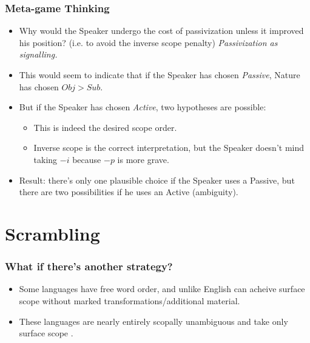 \documentclass[aspectratio=169]{beamer}
\begin{document}
\begin{frame}
	\frametitle{Meta-game Thinking}\pause

	\begin{itemize}
		\item Why would the Speaker undergo the cost of passivization unless it improved his position? (i.e. to avoid the inverse scope penalty) \textit{Passivization as signalling.}\pause
		\item This would seem to indicate that if the Speaker has chosen \textit{Passive}, Nature has chosen $Obj > Sub$.\pause
		\item But if the Speaker has chosen \textit{Active}, two hypotheses are possible:\pause
			\begin{itemize}
				\item This is indeed the desired scope order.\pause
				\item Inverse scope is the correct interpretation, but the Speaker doesn't mind taking $-i$ because $-p$ is more grave.\pause
			\end{itemize}
		\item Result: there's only one plausible choice if the Speaker uses a Passive, but there are two possibilities if he uses an Active (ambiguity).
	\end{itemize}
\end{frame}

\section{Scrambling}

\begin{frame}
	\frametitle{What if there's another strategy?}\pause
\begin{itemize}
	\item Some languages have free word order, and unlike English can acheive surface scope without marked transformations/additional material.\pause
	\item These languages are nearly entirely scopally unambiguous and take only surface scope \parencite{karimi03}.\pause

\begin{exe}
\ex\label{pers} \begin{xlist}
\pause
{}
\end{xlist}\end{exe}
\end{itemize}
\end{frame}
\end{document}
